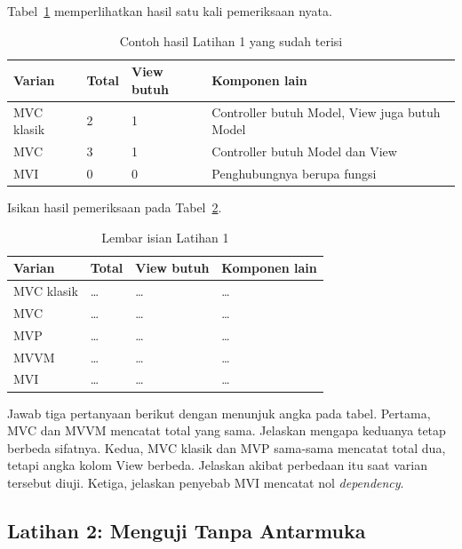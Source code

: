Tabel~\ref{tab:lat1mv-contoh} memperlihatkan hasil satu kali pemeriksaan nyata.

\begin{table}[htbp]
  \centering
  \caption{Contoh hasil Latihan 1 yang sudah terisi}
  \label{tab:lat1mv-contoh}
  \begin{tabularx}{\textwidth}{|l|l|l|X|}
    \hline
    \textbf{Varian} & \textbf{Total} & \textbf{View butuh} & \textbf{Komponen lain} \\
    \hline
    MVC klasik & 2 & 1 & Controller butuh Model, View juga butuh Model \\
    \hline
    MVC & 3 & 1 & Controller butuh Model dan View \\
    \hline
    MVI & 0 & 0 & Penghubungnya berupa fungsi \\
    \hline
  \end{tabularx}
\end{table}

Isikan hasil pemeriksaan pada Tabel~\ref{tab:lat1mv-hasil}.

\begin{table}[htbp]
  \centering
  \caption{Lembar isian Latihan 1}
  \label{tab:lat1mv-hasil}
  \begin{tabularx}{\textwidth}{|l|l|l|X|}
    \hline
    \textbf{Varian} & \textbf{Total} & \textbf{View butuh} & \textbf{Komponen lain} \\
    \hline
    MVC klasik & \dots & \dots & \dots \\
    \hline
    MVC & \dots & \dots & \dots \\
    \hline
    MVP & \dots & \dots & \dots \\
    \hline
    MVVM & \dots & \dots & \dots \\
    \hline
    MVI & \dots & \dots & \dots \\
    \hline
  \end{tabularx}
\end{table}

Jawab tiga pertanyaan berikut dengan menunjuk angka pada tabel. Pertama, MVC
dan MVVM mencatat total yang sama. Jelaskan mengapa keduanya tetap berbeda
sifatnya. Kedua, MVC klasik dan MVP sama-sama mencatat total dua, tetapi angka
kolom View berbeda. Jelaskan akibat perbedaan itu saat varian tersebut diuji.
Ketiga, jelaskan penyebab MVI mencatat nol \textit{dependency}.

\subsection*{Latihan 2: Menguji Tanpa Antarmuka}

